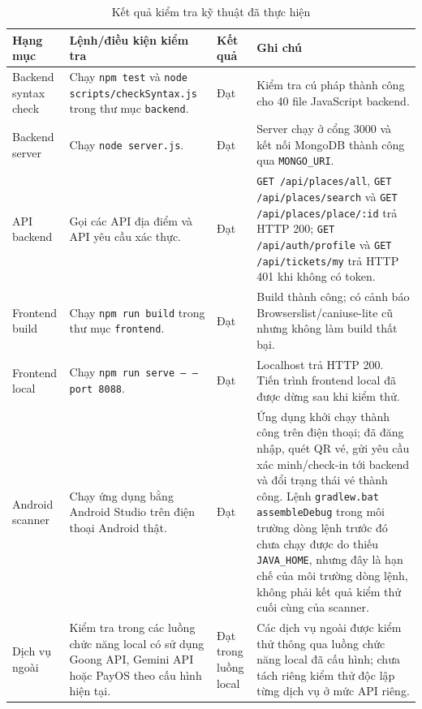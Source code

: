 ﻿\documentclass[../DoAn.tex]{subfiles}
\begin{document}
\begin{table}[H]
\centering
\caption{Kết quả kiểm tra kỹ thuật đã thực hiện}
\label{tab:technical-test-results}
\small
\renewcommand{\arraystretch}{1.15}
\setlength{\tabcolsep}{4pt}
\begin{tabularx}{\textwidth}{|L{2.8cm}|Y|L{2.0cm}|Y|}
\hline
\textbf{Hạng mục} & \textbf{Lệnh/điều kiện kiểm tra} & \textbf{Kết quả} & \textbf{Ghi chú} \\
\hline
Backend syntax check & Chạy \texttt{npm test} và \texttt{node scripts/checkSyntax.js} trong thư mục \texttt{backend}. & Đạt & Kiểm tra cú pháp thành công cho 40 file JavaScript backend. \\
\hline
Backend server & Chạy \texttt{node server.js}. & Đạt & Server chạy ở cổng 3000 và kết nối MongoDB thành công qua \texttt{MONGO\_URI}. \\
\hline
API backend & Gọi các API địa điểm và API yêu cầu xác thực. & Đạt & \texttt{GET /api/places/all}, \texttt{GET /api/places/search} và \texttt{GET /api/places/place/:id} trả HTTP 200; \texttt{GET /api/auth/profile} và \texttt{GET /api/tickets/my} trả HTTP 401 khi không có token. \\
\hline
Frontend build & Chạy \texttt{npm run build} trong thư mục \texttt{frontend}. & Đạt & Build thành công; có cảnh báo Browserslist/caniuse-lite cũ nhưng không làm build thất bại. \\
\hline
Frontend local & Chạy \texttt{npm run serve -- --port 8088}. & Đạt & Localhost trả HTTP 200. Tiến trình frontend local đã được dừng sau khi kiểm thử. \\
\hline
Android scanner & Chạy ứng dụng bằng Android Studio trên điện thoại Android thật. & Đạt & Ứng dụng khởi chạy thành công trên điện thoại; đã đăng nhập, quét QR vé, gửi yêu cầu xác minh/check-in tới backend và đổi trạng thái vé thành công. Lệnh \texttt{gradlew.bat assembleDebug} trong môi trường dòng lệnh trước đó chưa chạy được do thiếu \texttt{JAVA\_HOME}, nhưng đây là hạn chế của môi trường dòng lệnh, không phải kết quả kiểm thử cuối cùng của scanner. \\
\hline
Dịch vụ ngoài & Kiểm tra trong các luồng chức năng local có sử dụng Goong API, Gemini API hoặc PayOS theo cấu hình hiện tại. & Đạt trong luồng local & Các dịch vụ ngoài được kiểm thử thông qua luồng chức năng local đã cấu hình; chưa tách riêng kiểm thử độc lập từng dịch vụ ở mức API riêng. \\
\hline
\end{tabularx}
\end{table}
\end{document}
